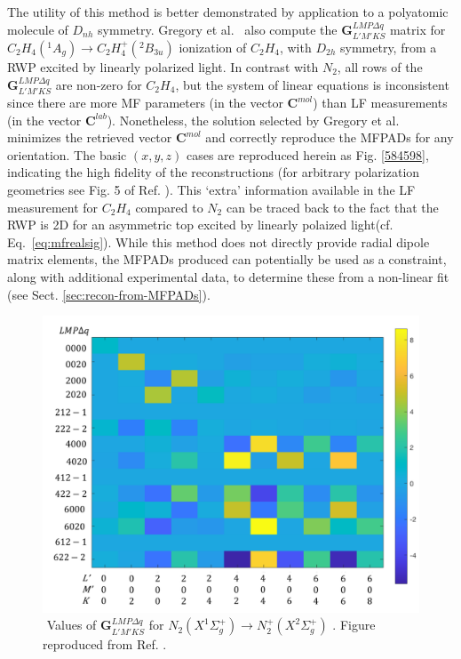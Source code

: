 \documentclass[10pt]{article}
\begin{document}
The utility of this method is better demonstrated by application to a polyatomic molecule of $D_{nh}$ symmetry. Gregory et al.~\cite{gregory2021MolecularFramePhotoelectron} also compute the $\mathbf{{G}}^{LMP\Delta q }_{L'M'KS}$ matrix for $C_2H_4(^1A_g) \rightarrow C_2H_4^+(^2B_{3u})$ ionization of $C_2H_4$, with $D_{2h}$ symmetry, from a RWP excited by linearly polarized light. In contrast with $N_2$, all rows of the $\mathbf{{G}}^{LMP\Delta q }_{L'M'KS}$ are non-zero for $C_2H_4$, but the system of linear equations is inconsistent since there are more MF parameters (in the vector $\mathbf{C}^{mol}$) than LF measurements (in the vector $\mathbf{C}^{lab}$). Nonetheless, the solution selected by Gregory et al. minimizes the retrieved vector $\mathbf{C}^{mol}$ and correctly reproduce the MFPADs for any orientation. The basic $(x,y,z)$ cases are reproduced herein as Fig. \ref{584598}, indicating the high fidelity of the reconstructions (for arbitrary polarization geometries see Fig. 5 of Ref. \cite{gregory2021MolecularFramePhotoelectron}). This `extra' information available in the LF measurement for $C_2H_4$ compared to $N_2$ can be traced back to the fact that the RWP is 2D for an asymmetric top excited by linearly polaized light(cf. Eq.~\ref{eq:mfrealsig}). While this method does not directly provide radial dipole matrix elements, the MFPADs produced can potentially be used as a constraint, along with additional experimental data, to determine these from a non-linear fit (see Sect. \ref{sec:recon-from-MFPADs}). 

\begin{figure}[]
\begin{center}
\includegraphics[width=\textwidth,height=\dimexpr\textheight-4\baselineskip-\abovecaptionskip-\belowcaptionskip\relax,keepaspectratio]{figures/GFinalplot.png}
\caption{\(\) Values of \(\mathbf{G}^{LMP\Delta q }_{L'M'KS}\) for \(N_2(X^{1}\Sigma^{+}_{g}) \rightarrow N^+_2(X^{2}\Sigma^{+}_{g})\) . Figure reproduced from Ref. \cite{gregory2021MolecularFramePhotoelectron}.\label{931809}}
\end{center}
\end{figure}
\end{document}
